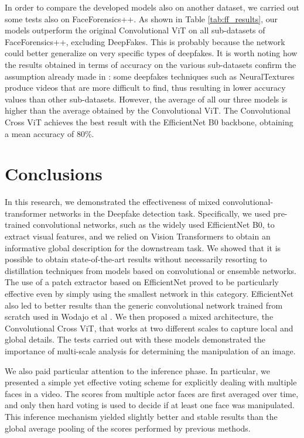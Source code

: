 \documentclass[runningheads]{llncs}
\begin{document}
In order to compare the developed models also on another dataset, we carried out some tests also on FaceForensics++. As shown in Table \ref{tab:ff_results}, our models outperform the original Convolutional ViT \cite{wodajo2021deepfake} on all sub-datasets of FaceForensics++, excluding DeepFakes. This is probably because the network could better generalize on very specific types of deepfakes. It is worth noting how the results obtained in terms of accuracy on the various sub-datasets confirm the assumption already made in \cite{wodajo2021deepfake}: some deepfakes techniques such as NeuralTextures produce videos that are more difficult to find, thus resulting in lower accuracy values than other sub-datasets. However, the average of all our three models is higher than the average obtained by the Convolutional ViT. The Convolutional Cross ViT achieves the best result with the EfficientNet B0 backbone, obtaining a mean accuracy of 80\%. 

\section{Conclusions}
In this research, we demonstrated the effectiveness of mixed convolutional-transformer networks in the Deepfake detection task. Specifically, we used pre-trained convolutional networks, such as the widely used EfficientNet B0, to extract visual features, and we relied on Vision Transformers to obtain an informative global description for the downstream task. We showed that it is possible to obtain state-of-the-art results without necessarily resorting to distillation techniques from models based on convolutional or ensemble networks.
The use of a patch extractor based on EfficientNet proved to be particularly effective even by simply using the smallest network in this category. EfficientNet also led to better results than the generic convolutional network trained from scratch used in Wodajo et al \cite{wodajo2021deepfake}.
We then proposed a mixed architecture, the Convolutional Cross ViT, that works at two different scales to capture local and global details.
The tests carried out with these models demonstrated the importance of multi-scale analysis for determining the manipulation of an image. 

We also paid particular attention to the inference phase. In particular, we presented a simple yet effective voting scheme for explicitly dealing with multiple faces in a video. The scores from multiple actor faces are first averaged over time, and only then hard voting is used to decide if at least one face was manipulated. This inference mechanism yielded slightly better and stable results than the global average pooling of the scores performed by previous methods. 





  
\end{document}
